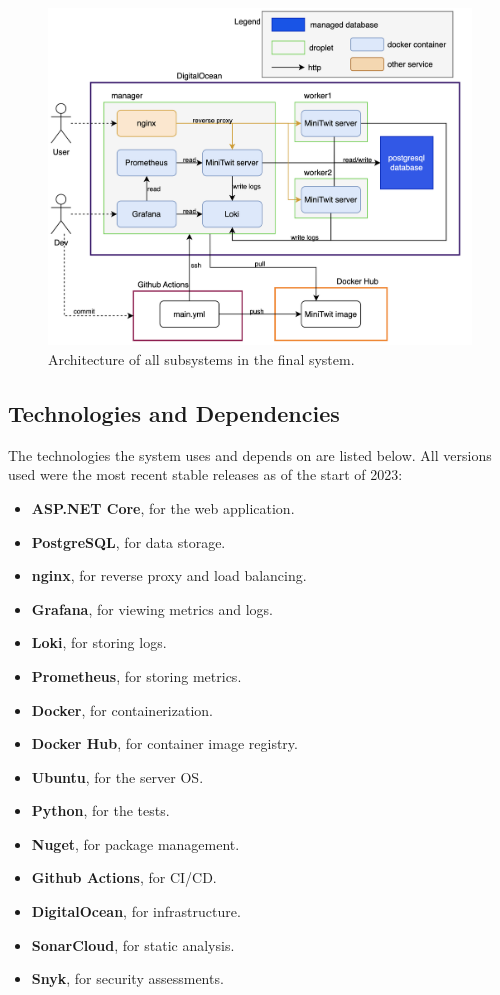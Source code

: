 \begin{figure}[H]
    \centering
    \includegraphics[width=\textwidth]{images/architecture2.png}
    \caption{Architecture of all subsystems in the final system.}
    \label{fig:architecture}
\end{figure}

\subsection{Technologies and Dependencies}

The technologies the system uses and depends on are listed below. All versions used were the most recent stable releases as of the start of 2023:

\begin{itemize}
    \item \textbf{ASP.NET Core}, for the web application.
    \item \textbf{PostgreSQL}, for data storage.
    \item \textbf{nginx}, for reverse proxy and load balancing.
    \item \textbf{Grafana}, for viewing metrics and logs.
    \item \textbf{Loki}, for storing logs.
    \item \textbf{Prometheus}, for storing metrics.
    \item \textbf{Docker}, for containerization.
    \item \textbf{Docker Hub}, for container image registry.
    \item \textbf{Ubuntu}, for the server OS.
    \item \textbf{Python}, for the tests.
    \item \textbf{Nuget}, for package management.
    \item \textbf{Github Actions}, for CI/CD.
    \item \textbf{DigitalOcean}, for infrastructure.
    \item \textbf{SonarCloud}, for static analysis.
    \item \textbf{Snyk}, for security assessments. \\
\end{itemize}

